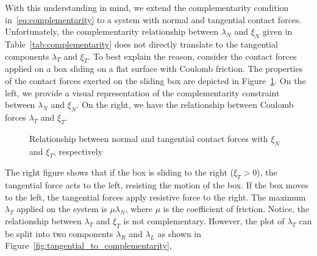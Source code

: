 With this understanding in mind, we extend the complementarity condition
in~\eqref{eq:complementarity} to a system with normal and tangential contact
forces.
%
Unfortunately, the complementarity relationship between $\lambda_N$ and $\xi_N$
given in Table~\ref{tab:complementarity} does not directly translate to the
tangential components $\lambda_T$ and $\xi_T$.
%
To best explain the reason, consider the contact forces applied on a box sliding
on a flat surface with Coulomb friction.
%
The properties of the contact forces exerted on the sliding box are depicted in
Figure~\ref{fig:unilateral_primitive}.
%
On the left, we provide a visual representation of the complementarity
constraint between $\lambda_N$ and $\xi_N$.
%
On the right, we have the relationship between Coulomb forces $\lambda_T$ and
$\xi_T$.
%
\begin{figure}[tb]
  \centering
  \caption{Relationship between normal and tangential contact forces with $\xi_N$ and $\xi_T$, respectively}
  \label{fig:unilateral_primitive}
\end{figure}
%
%
The right figure shows that if the box is sliding to the right ($\xi_T > 0$),
the tangential force acts to the left, resisting the motion of the box.
%
If the box moves to the left, the tangential forces apply resistive force to
the right.
%
The maximum $\lambda_T$ applied on the system is $\mu \lambda_N$, where $\mu$ is
the coefficient of friction.
%
Notice, the relationship between $\lambda_T$ and $\xi_T$ is not complementary.
%
However, the plot of $\lambda_T$ can be split into two components $\lambda_R$
and $\lambda_L$ as shown in Figure~\ref{fig:tangential_to_complementarity},
